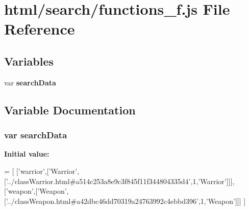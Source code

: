 \section{html/search/functions\-\_\-f.js File Reference}
\label{functions__f_8js}
\subsection*{Variables}
\begin{DoxyCompactItemize}
\item 
var {\bf search\-Data}
\end{DoxyCompactItemize}


\subsection{Variable Documentation}
\subsubsection[{search\-Data}]{\setlength{\rightskip}{0pt plus 5cm}var search\-Data}\label{functions__f_8js_ad01a7523f103d6242ef9b0451861231e}
{\bfseries Initial value\-:}
\begin{DoxyCode}
=
[
  [\textcolor{stringliteral}{'warrior'},[\textcolor{stringliteral}{'Warrior'},[\textcolor{stringliteral}{'../classWarrior.html#a514c253a8e9c3f845f11f344804335d4'},1,\textcolor{stringliteral}{'Warrior'}]]],
  [\textcolor{stringliteral}{'weapon'},[\textcolor{stringliteral}{'Weapon'},[\textcolor{stringliteral}{'../classWeapon.html#a42dbc46dd70319a24763992c4ebbd396'},1,\textcolor{stringliteral}{'Weapon'}]]]
]
\end{DoxyCode}
